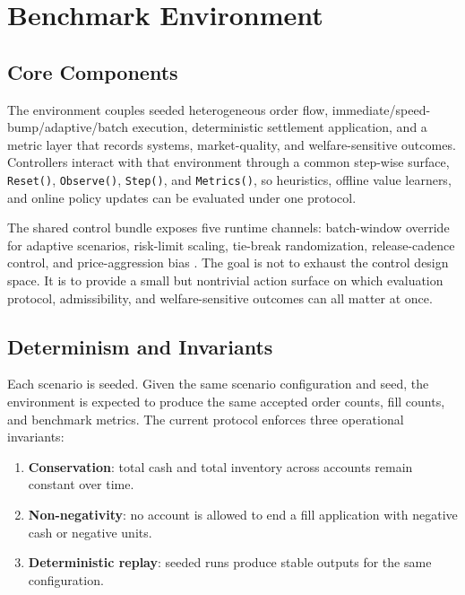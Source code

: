 \documentclass[11pt]{article}
\begin{document}
\section{Benchmark Environment}
\subsection{Core Components}
The environment couples seeded heterogeneous order flow, immediate/speed-bump/adaptive/batch execution, deterministic settlement application, and a metric layer that records systems, market-quality, and welfare-sensitive outcomes. Controllers interact with that environment through a common step-wise surface, \texttt{Reset()}, \texttt{Observe()}, \texttt{Step()}, and \texttt{Metrics()}, so heuristics, offline value learners, and online policy updates can be evaluated under one protocol.

The shared control bundle exposes five runtime channels: batch-window override for adaptive scenarios, risk-limit scaling, tie-break randomization, release-cadence control, and price-aggression bias \cite{brockman2016gym}. The goal is not to exhaust the control design space. It is to provide a small but nontrivial action surface on which evaluation protocol, admissibility, and welfare-sensitive outcomes can all matter at once.

\subsection{Determinism and Invariants}
Each scenario is seeded. Given the same scenario configuration and seed, the environment is expected to produce the same accepted order counts, fill counts, and benchmark metrics. The current protocol enforces three operational invariants:
\begin{enumerate}[leftmargin=*]
  \item \textbf{Conservation}: total cash and total inventory across accounts remain constant over time.
  \item \textbf{Non-negativity}: no account is allowed to end a fill application with negative cash or negative units.
  \item \textbf{Deterministic replay}: seeded runs produce stable outputs for the same configuration.
\end{enumerate}
\end{document}
